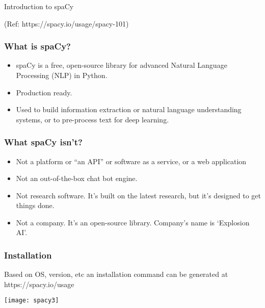\begin{frame}[fragile]\frametitle{}

\begin{center}
{\Large Introduction to spaCy}

{\tiny (Ref: https://spacy.io/usage/spacy-101)}

\end{center}


\end{frame}
%

\begin{frame}[fragile]\frametitle{What is spaCy?}
  \begin{itemize}
    \item spaCy is a free, open-source library for advanced Natural Language Processing (NLP) in Python.
		\item Production ready.
		\item Used to build information extraction or natural language understanding systems, or to pre-process text for deep learning.
  \end{itemize}
	
\end{frame}



\begin{frame}[fragile]\frametitle{What spaCy isn't?}
  \begin{itemize}
    \item Not a platform or “an API” or software as a service, or a web application
		\item Not an out-of-the-box chat bot engine.
		\item Not research software.  It's built on the latest research, but it's designed to get things done.
		\item Not a company. It's an open-source library. Company's name is `Explosion AI'.
  \end{itemize}
	
\end{frame}

\begin{frame}[fragile]\frametitle{Installation}
Based on OS, version, etc an installation command can be generated at https://spacy.io/usage

	
\begin{center}
\texttt{[image: spacy3]}
\end{center}

\end{frame}

